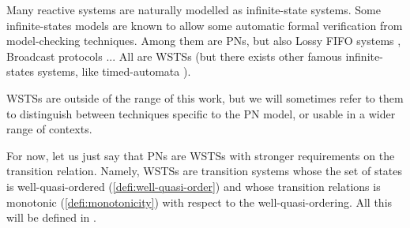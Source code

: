 Many reactive systems are naturally modelled as infinite-state systems.
Some infinite-states models are known to allow some automatic formal verification from model-checking techniques.
Among them are \acp{PN}, but also Lossy FIFO systems \citep{Abdulla98}, Broadcast protocols \citep{Emerson98}...
All are \acp{WSTS} (but there exists other famous infinite-states systems, like timed-automata \citep{Alur94}).

\acp{WSTS} are outside of the range of this work, but we will sometimes refer to them to distinguish between techniques specific to the \ac{PN} model, or usable in a wider range of contexts.

For now, let us just say that \acp{PN} are \acp{WSTS} with stronger requirements on the transition relation.
Namely, \acp{WSTS} are transition systems whose the set of states is well-quasi-ordered (\cref{defi:well-quasi-order}) and whose transition relations is monotonic (\cref{defi:monotonicity}) with respect to the well-quasi-ordering.
All this will be defined in .


